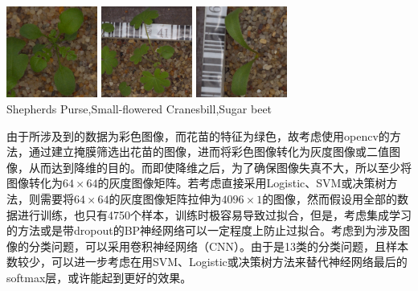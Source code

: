 \begin{center}
\includegraphics[width=30mm,height=30mm]{../figures/Shepherds_Purse_0bef4ae08.png} 	
\includegraphics[width=30mm,height=30mm]{../figures/Small-flowered_Cranesbill_0e7f05ec0.png} 	
\includegraphics[width=30mm,height=30mm]{../figures/Sugar_beet_1bdfd2206.png} 	\\
Shepherds Purse,Small-flowered Cranesbill,Sugar beet
\end{center}

由于所涉及到的数据为彩色图像，而花苗的特征为绿色，故考虑使用opencv的方法，通过建立掩膜筛选出花苗的图像，进而将彩色图像转化为灰度图像或二值图像，从而达到降维的目的。而即使降维之后，为了确保图像失真不大，所以至少将图像转化为$64\times 64$的灰度图像矩阵。若考虑直接采用Logistic、SVM或决策树方法，则需要将$64\times 64$的灰度图像矩阵拉伸为$4096\times 1$的图像，然而假设用全部的数据进行训练，也只有4750个样本，训练时极容易导致过拟合，但是，考虑集成学习的方法或是带dropout的BP神经网络可以一定程度上防止过拟合。考虑到为涉及图像的分类问题，可以采用卷积神经网络（CNN）。由于是13类的分类问题，且样本数较少，可以进一步考虑在用SVM、Logistic或决策树方法来替代神经网络最后的softmax层，或许能起到更好的效果。